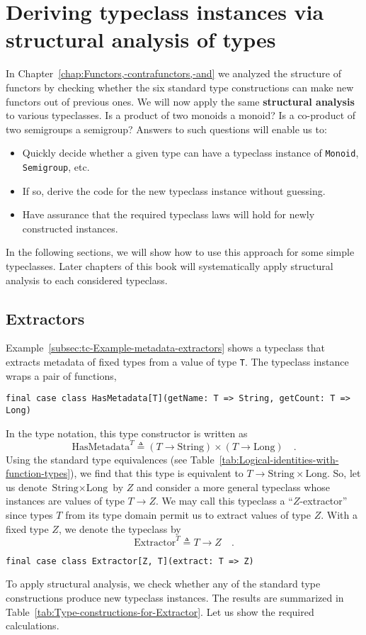 \section{Deriving typeclass instances via structural analysis of types}

In Chapter~\ref{chap:Functors,-contrafunctors,-and} we analyzed
the structure of functors by checking whether the six standard type
constructions can make new functors out of previous ones. We will
now apply the same \textbf{structural
analysis} to various typeclasses. Is a product of two monoids a monoid?
Is a co-product of two semigroups a semigroup? Answers to such questions
will enable us to:
\begin{itemize}
\item Quickly decide whether a given type can have a typeclass instance
of \lstinline!Monoid!, \lstinline!Semigroup!, etc.
\item If so, derive the code for the new typeclass instance without guessing.
\item Have assurance that the required typeclass laws will hold for newly
constructed instances.
\end{itemize}
In the following sections, we will show how to use this approach for
some simple typeclasses. Later chapters of this book will systematically
apply structural analysis to each considered typeclass.

\subsection{Extractors}

Example~\ref{subsec:tc-Example-metadata-extractors} shows a typeclass
that extracts metadata of fixed types from a value of type \lstinline!T!.
The typeclass instance wraps a pair of functions,
\begin{lstlisting}
final case class HasMetadata[T](getName: T => String, getCount: T => Long)
\end{lstlisting}
In the type notation, this type constructor is written as
\[
\text{HasMetadata}^{T}\triangleq(T\rightarrow\text{String})\times(T\rightarrow\text{Long})\quad.
\]
Using the standard type equivalences (see Table~\ref{tab:Logical-identities-with-function-types}),
we find that this type is equivalent to $T\rightarrow\text{String}\times\text{Long}$.
So, let us denote $\text{String}\times\text{Long}$ by $Z$ and consider
a more general typeclass whose instances are values of type $T\rightarrow Z$.
We may call this typeclass a ``$Z$-extractor''
since types $T$ from its type domain permit us to extract values
of type $Z$. With a fixed type $Z$, we denote the typeclass by
\[
\text{Extractor}^{T}\triangleq T\rightarrow Z\quad.
\]
\begin{lstlisting}
final case class Extractor[Z, T](extract: T => Z)
\end{lstlisting}
To apply structural analysis, we check whether any of the standard
type constructions produce new typeclass instances. The results are
summarized in Table~\ref{tab:Type-constructions-for-Extractor}.
Let us show the required calculations.

